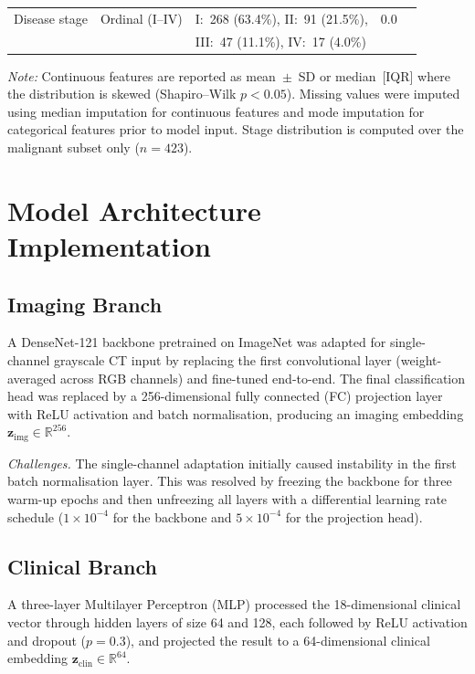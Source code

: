 {\begin{table}[htbp]
\begin{tabular}{@{}llll r@{}}
Disease stage          & Ordinal (I--IV)     & I:~268 (63.4\%), II:~91 (21.5\%),     & 0.0  \\
                       &                     & III:~47 (11.1\%), IV:~17 (4.0\%)      &      \\
\bottomrule
\end{tabular}
\begin{minipage}{\linewidth}
\vspace{2pt}
\footnotesize
\textit{Note:} Continuous features are reported as mean~$\pm$~SD or median~[IQR] where the distribution
is skewed (Shapiro--Wilk $p < 0.05$). Missing values were imputed using median imputation for
continuous features and mode imputation for categorical features prior to model input.
Stage distribution is computed over the malignant subset only ($n = 423$).
\end{minipage}
\end{table}

\section{Model Architecture Implementation}

\subsection{Imaging Branch}

A DenseNet-121 backbone pretrained on ImageNet was adapted for single-channel grayscale
CT input by replacing the first convolutional layer (weight-averaged across RGB channels)
and fine-tuned end-to-end. The final classification head was replaced by a 256-dimensional
fully connected (FC) projection layer with ReLU activation and batch normalisation, producing
an imaging embedding $\mathbf{z}_{\text{img}} \in \mathbb{R}^{256}$.

\textit{Challenges.}
The single-channel adaptation initially caused instability in the first batch normalisation
layer. This was resolved by freezing the backbone for three warm-up epochs and then
unfreezing all layers with a differential learning rate schedule ($1 \times 10^{-4}$ for the
backbone and $5 \times 10^{-4}$ for the projection head).

\subsection{Clinical Branch}

A three-layer Multilayer Perceptron (MLP) processed the 18-dimensional clinical vector through
hidden layers of size 64 and 128, each followed by ReLU activation and dropout
($p = 0.3$), and projected the result to a 64-dimensional clinical embedding
$\mathbf{z}_{\text{clin}} \in \mathbb{R}^{64}$.

}
